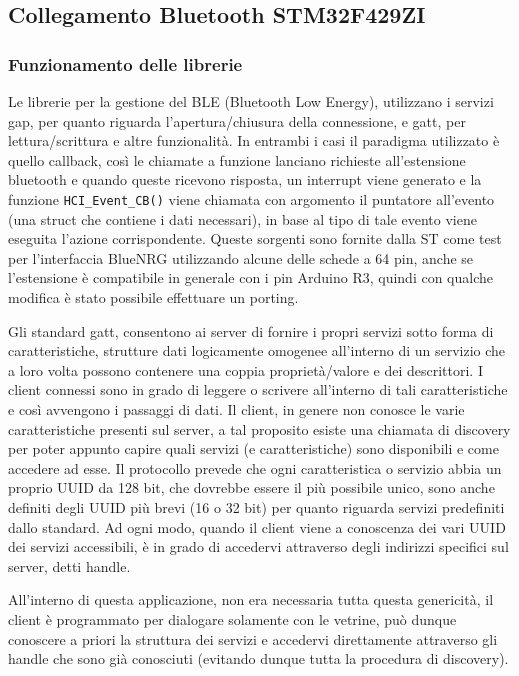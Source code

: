 \subsection{Collegamento Bluetooth STM32F429ZI}

\subsubsection{Funzionamento delle librerie}

Le librerie per la gestione del BLE (Bluetooth Low Energy), utilizzano i servizi gap, per quanto riguarda l'apertura/chiusura della connessione, e gatt, per lettura/scrittura e altre funzionalit\`a. In entrambi i casi il paradigma utilizzato \`e quello callback, cos\`i le chiamate a funzione lanciano richieste all'estensione bluetooth e quando queste ricevono risposta, un interrupt viene generato e la funzione \texttt{HCI\_Event\_CB()} viene chiamata con argomento il puntatore all'evento (una struct che contiene i dati necessari), in base al tipo di tale evento viene eseguita l'azione corrispondente. 
Queste sorgenti sono fornite dalla ST come test per l'interfaccia BlueNRG utilizzando alcune delle schede a 64 pin, anche se l'estensione \`e compatibile in generale con i pin Arduino R3, quindi con qualche modifica \`e stato possibile effettuare un porting. 

Gli standard gatt, consentono ai server di fornire i propri servizi sotto forma di caratteristiche, strutture dati logicamente omogenee all'interno di un servizio che a loro volta possono contenere una coppia propriet\`a/valore e dei descrittori. I client connessi sono in grado di leggere o scrivere all'interno di tali caratteristiche e cos\`i avvengono i passaggi di dati. Il client, in genere non conosce le varie caratteristiche presenti sul server, a tal proposito esiste una chiamata di discovery per poter appunto capire quali servizi (e caratteristiche) sono disponibili e come accedere ad esse. Il protocollo prevede che ogni caratteristica o servizio abbia un proprio UUID da 128 bit, che dovrebbe essere il pi\`u possibile unico, sono anche definiti degli UUID pi\`u brevi (16 o 32 bit) per quanto riguarda servizi predefiniti dallo standard. Ad ogni modo, quando il client viene a conoscenza dei vari UUID dei servizi accessibili, \`e in grado di accedervi attraverso degli indirizzi specifici sul server, detti handle. 

All'interno di questa applicazione, non era necessaria tutta questa genericit\`a, il client \`e programmato per dialogare solamente con le vetrine, pu\`o dunque conoscere a priori la struttura dei servizi e accedervi direttamente attraverso gli handle che sono gi\`a conosciuti (evitando dunque tutta la procedura di discovery).

